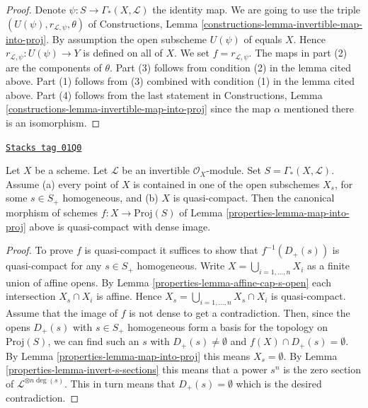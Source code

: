 \begin{proof}
Denote $\psi : S \to \Gamma_*(X, \mathcal{L})$ the identity map.
We are going to use the triple
$(U(\psi), r_{\mathcal{L}, \psi}, \theta)$ of
Constructions, Lemma \ref{constructions-lemma-invertible-map-into-proj}.
By assumption the open subscheme $U(\psi)$ of equals $X$. Hence
$r_{\mathcal{L}, \psi} : U(\psi) \to Y$ is defined on all of $X$.
We set $f = r_{\mathcal{L}, \psi}$.
The maps in part (2) are the components of $\theta$.
Part (3) follows from condition (2) in the lemma cited above.
Part (1) follows from (3) combined with condition (1) in the lemma
cited above. Part (4) follows from the last statement in
Constructions, Lemma \ref{constructions-lemma-invertible-map-into-proj}
since the map $\alpha$ mentioned there is an isomorphism.
\end{proof}

\begin{lemma}
\label{properties-lemma-map-into-proj-quasi-compact}
\href{https://stacks.math.columbia.edu/tag/01Q0}{\texttt{Stacks tag 01Q0}}

Let $X$ be a scheme. Let $\mathcal{L}$ be an invertible $\mathcal{O}_X$-module.
Set $S = \Gamma_*(X, \mathcal{L})$.
Assume (a) every point of $X$ is contained in one of the
open subschemes $X_s$, for some $s \in S_{+}$ homogeneous,
and (b) $X$ is quasi-compact. Then the canonical morphism of schemes
$f : X \longrightarrow \text{Proj}(S)$ of Lemma \ref{properties-lemma-map-into-proj}
above is quasi-compact with dense image.
\end{lemma}

\begin{proof}

To prove $f$ is quasi-compact it suffices to show that $f^{-1}(D_{+}(s))$
is quasi-compact for any $s \in S_{+}$ homogeneous. Write
$X = \bigcup_{i = 1, \ldots, n} X_i$ as a finite union of
affine opens. By Lemma \ref{properties-lemma-affine-cap-s-open} each intersection
$X_s \cap X_i$ is affine. Hence $X_s = \bigcup_{i = 1, \ldots, n} X_s \cap X_i$
is quasi-compact. Assume that the image of $f$ is not dense to get
a contradiction. Then, since the opens $D_+(s)$ with $s \in S_+$ homogeneous
form a basis for the topology on $\text{Proj}(S)$, we can find such
an $s$ with $D_+(s) \not = \emptyset$ and $f(X) \cap D_+(s) = \emptyset$.
By Lemma \ref{properties-lemma-map-into-proj}
this means $X_s = \emptyset$. By Lemma \ref{properties-lemma-invert-s-sections}
this means that a power $s^n$ is the zero section of
$\mathcal{L}^{\otimes n\deg(s)}$.
This in turn means that $D_+(s) = \emptyset$ which is the
desired contradiction.
\end{proof}

